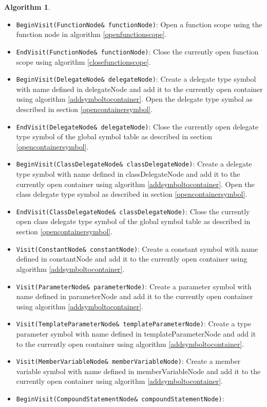 \documentclass[a4paper,oneside,11pt]{book}
\theoremstyle{definition}
\newtheorem{algo}{Algorithm}[section]
\begin{document}
\begin{algo}
\begin{itemize}
add it to the currently open container using algorithm \ref{addsymboltocontainer}.
\item
\verb|BeginVisit(FunctionNode& functionNode)|:
Open a function scope using the function node in algorithm \ref{openfunctionscope}.
\item
\verb|EndVisit(FunctionNode& functionNode)|:
Close the currently open function scope using algorithm \ref{closefunctionscope}.
\item
\verb|BeginVisit(DelegateNode& delegateNode)|:
Create a delegate type symbol with name defined in delegateNode and
add it to the currently open container using algorithm \ref{addsymboltocontainer}.
Open the delegate type symbol as described in section \ref{opencontainersymbol}.
\item
\verb|EndVisit(DelegateNode& delegateNode)|:
Close the currently open delegate type symbol of the global symbol table as described in section \ref{opencontainersymbol}.
\item
\verb|BeginVisit(ClassDelegateNode& classDelegateNode)|:
Create a delegate type symbol with name defined in classDelegateNode and
add it to the currently open container using algorithm \ref{addsymboltocontainer}.
Open the class delegate type symbol as described in section \ref{opencontainersymbol}.
\item
\verb|EndVisit(ClassDelegateNode& classDelegateNode)|:
Close the currently open class delegate type symbol of the global symbol table as described in section \ref{opencontainersymbol}.
\item
\verb|Visit(ConstantNode& constantNode)|:
Create a constant symbol with name defined in constantNode and
add it to the currently open container using algorithm \ref{addsymboltocontainer}.
\item
\verb|Visit(ParameterNode& parameterNode)|:
Create a parameter symbol with name defined in parameterNode and
add it to the currently open container using algorithm \ref{addsymboltocontainer}.
\item
\verb|Visit(TemplateParameterNode& templateParameterNode)|:
Create a type parameter symbol with name defined in templateParameterNode and
add it to the currently open container using algorithm \ref{addsymboltocontainer}.
\item
\verb|Visit(MemberVariableNode& memberVariableNode)|:
Create a member variable symbol with name defined in memberVariableNode and
add it to the currently open container using algorithm \ref{addsymboltocontainer}.
\item
\verb|BeginVisit(CompoundStatementNode& compoundStatementNode)|:

\end{itemize}
\end{algo}
\end{document}
